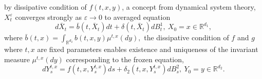 \documentclass[11pt,reqno]{amsart}
\numberwithin{equation}{section}
\begin{document}
by dissipative condition of $f(t,x,y)$, a concept from dynamical system theory, $X_{t}^{\varepsilon}$ converges strongly as $\varepsilon \rightarrow0$ to averaged equation
$$d\bar{X}_{t}=\bar{b}(t,\bar{X}_{t})dt+\delta(t,\bar{X}_{t})dB^{1}_{t},\ X_{0}=x\in \mathbb{R}^{d_{1}},$$
where $\bar{b}(t,x)=\int_{\mathbb{R}^{d_{2}}}b(t,x,y)\mu^{t,x}(dy),$
the dissipative condition of $f$ and $g$ where $t,x$  are fixed parameters enables existence and uniqueness of the invariant measure $\mu^{t,x}(dy)$ corresponding to the frozen equation,
$$
dY^{t,x}_{s}=f(t,x,Y^{t,x}_{s})ds+\delta_{2}(t,x,Y^{t,x}_{s})dB^{2}_{s},\ Y_{0}=y\in \mathbb{R}^{d_{2} }.
$$
\end{document}
